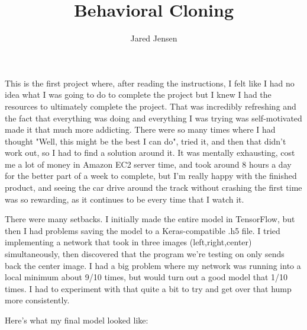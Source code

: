 \documentclass[letterpaper,12pt]{article}
\author{Jared Jensen}
\title{Behavioral Cloning}
\begin{document}
	\maketitle{}

	This is the first project where, after reading the instructions, I felt like I had no idea what I was going to do to complete the project but I knew I had the resources to ultimately complete the project. That was incredibly refreshing and the fact that everything was doing and everything I was trying was self-motivated made it that much more addicting. There were so many times where I had thought "Well, this might be the best I can do", tried it, and then that didn't work out, so I had to find a solution around it. It was mentally exhausting, cost me a lot of money in Amazon EC2 server time, and took around 8 hours a day for the better part of a week to complete, but I'm really happy with the finished product, and seeing the car drive around the track without crashing the first time was so rewarding, as it continues to be every time that I watch it.

	There were many setbacks. I initially made the entire model in TensorFlow, but then I had problems saving the model to a Keras-compatible .h5 file. I tried implementing a network that took in three images (left,right,center) simultaneously, then discovered that the program we're testing on only sends back the center image. I had a big problem where my network was running into a local minimum about 9/10 times, but would turn out a good model that 1/10 times. I had to experiment with that quite a bit to try and get over that hump more consistently.

	Here's what my final model looked like:
\end{document}

